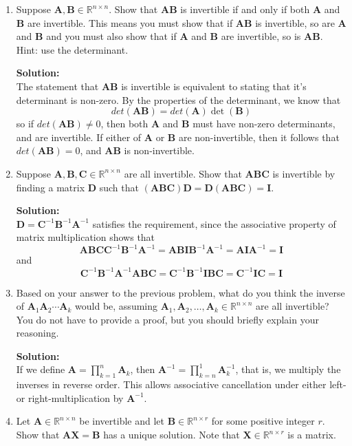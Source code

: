 \documentclass[]{article}
\newcommand{\R}{\mathbb{R}}				%
\newcommand{\A}{\bm{A}}					%
\newcommand{\I}{\bm{I}}					%
\newcommand{\solution}{\vskip 0.5cm \textbf{\large Solution:} \\}
\begin{document}
\begin{enumerate}
	\item Suppose $\A,\bm{B}\in\R^{n\times n}$. Show that $\bm{AB}$ is invertible if and only if both $\A$ and $\bm{B}$ are invertible. This means you must show that if $\bm{AB}$ is invertible, so are $\A$ and $\bm{B}$ and you must also show that if $\A$ and $\bm{B}$ are invertible, so is $\bm{AB}$. Hint: use the determinant.

	  \solution

      The statement that $\A\bm{B}$ is invertible is equivalent to
      stating that it's determinant is non-zero. By the properties of
      the determinant, we know that $$det(\A \bm{B}) = det(\A)
      \det(\bm{B})$$ so if $det(\A\bm{B}) \neq 0$, then both $\A$ and
      $\bm{B}$ must have non-zero determinants, and are invertible. If
      either of $\A$ or $\bm{B}$ are non-invertible, then it follows
      that $det(\A\bm{B}) = 0$, and $\A\bm{B}$ is non-invertible.

	\item Suppose $\A,\bm{B},\bm{C}\in\R^{n\times n}$ are all invertible. Show that $\bm{ABC}$ is invertible by finding a matrix $\bm{D}$ such that $(\bm{ABC})\bm{D}=\bm{D}(\bm{ABC})=\bm{I}$.

	  \solution

      $\bm{D} = \bm{C}^{-1} \bm{B}^{-1} \A^{-1}$ satisfies the
      requirement, since the associative property of matrix
      multiplication shows that
      $$ \bm{ABC}\bm{C}^{-1} \bm{B}^{-1} \A^{-1} = \bm{ABI} \bm{B}^{-1} \A^{-1} = \bm{AI} \A^{-1} = \I $$
      and
      $$ \bm{C}^{-1} \bm{B}^{-1} \A^{-1} \bm{ABC} = \bm{C}^{-1} \bm{B}^{-1} \bm{IBC} = \bm{C}^{-1} \bm{IC} = \I $$
      
	\item Based on your answer to the previous problem, what do you think the inverse of $\A_1\A_2\cdots \A_k$ would be, assuming $\A_1,\A_2,\dots,\A_k\in\R^{n\times n}$ are all invertible? You do not have to provide a proof, but you should briefly explain your reasoning.

	  \solution

      If we define $\A = \prod_{k=1}^{n} \A_k$, then $\A^{-1} =
      \prod_{k=n}^{1} \A_k^{-1}$, that is, we multiply the inverses in
      reverse order. This allows associative cancellation under either
      left- or right-multiplication by $\A^{-1}$.


	\item Let $\A\in\R^{n\times n}$ be invertible and let $\bm{B}\in\R^{n\times r}$ for some positive integer $r$. Show that $\bm{AX}=\bm{B}$ has a unique solution. Note that $\bm{X}\in\R^{n\times r}$ is a matrix.


\end{enumerate}
\end{document}
